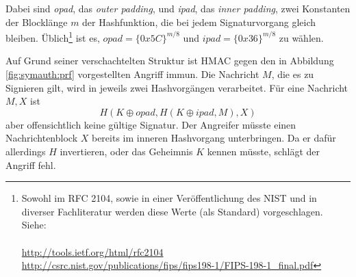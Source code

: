 Dabei sind \textit{opad}, das \textit{outer padding},
und \textit{ipad}, das \textit{inner padding}, zwei Konstanten der
Blocklänge $m$ der Hashfunktion, die bei jedem Signaturvorgang gleich
bleiben. Üblich\footnote{Sowohl im RFC 2104, sowie in einer
  Veröffentlichung des NIST und in diverser Fachliteratur werden diese
  Werte (als Standard) vorgeschlagen. Siehe: ~\\~\\
  \url{http://tools.ietf.org/html/rfc2104} \\
  \url{http://csrc.nist.gov/publications/fips/fips198-1/FIPS-198-1_final.pdf}}
ist es, $opad = \{0x5C\}^{m/8}$ und $ipad = \{0x36\}^{m/8}$ zu
wählen. 

Auf Grund seiner verschachtelten Struktur ist HMAC gegen den in
Abbildung \ref{fig:symauth:prf} vorgestellten Angriff immun.
Die Nachricht $M$, die es zu Signieren gilt, wird in jeweils zwei
Hash\-vorgängen verarbeitet. Für eine Nachricht $M,X$ ist
\begin{equation*}
 H(K \oplus \textit{opad}, H(K \oplus \textit{ipad}, M), X)
\end{equation*} 
aber offensichtlich keine gültige Signatur. Der
Angreifer müsste einen Nachrichtenblock $X$ bereits im inneren
Hashvorgang unterbringen. Da er dafür allerdings $H$ invertieren, oder
das Geheimnis $K$ kennen müsste, schlägt der Angriff fehl.
